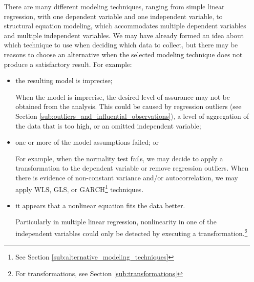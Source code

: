 There are many different modeling techniques, ranging from simple linear regression, with one dependent variable and one independent variable, to structural equation modeling, which accommodates multiple dependent variables and multiple independent variables. We may have already formed an idea about which technique to use when deciding which data to collect, but there may be reasons to choose an alternative when the selected modeling technique does not produce a satisfactory result. For example:

\begin{itemize}
  \item the resulting model is imprecise;

  When the model is imprecise, the desired level of assurance may not be obtained from the analysis. This could be caused by regression outliers (see Section \ref{sub:outliers_and_influential_observations}), a level of aggregation of the data that is too high, or an omitted independent variable;

  \item one or more of the model assumptions failed; or

  For example, when the normality test fails, we may decide to apply a transformation to the dependent variable or remove regression outliers. When there is evidence of non-constant variance and/or autocorrelation, we may apply WLS, GLS, or GARCH\footnote{See Section \ref{sub:alternative_modeling_techniques}} techniques.

  \item it appears that a nonlinear equation fits the data better.

  Particularly in multiple linear regression, nonlinearity in one of the independent variables could only be detected by executing a transformation.\footnote{For transformations, see Section \ref{sub:transformations}}
\end{itemize}

